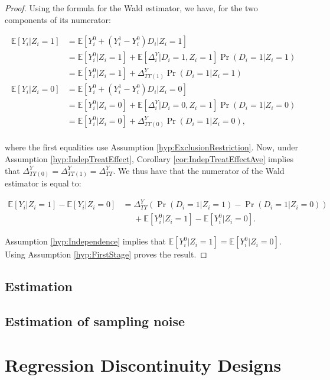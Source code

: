 \documentclass[
]{book}
\newcommand{\esp}[1]{\mathbb{E}[ #1 ]}
\theoremstyle{definition}
\theoremstyle{definition}
\theoremstyle{definition}
\theoremstyle{definition}
\theoremstyle{remark}
\begin{document}
\begin{proof}
\iffalse{} {Proof. } \fi{}Using the formula for the Wald estimator, we have, for the two components of its numerator:

\begin{align*}
\esp{Y_i|Z_i=1} & = \esp{Y_i^0+(Y_i^1-Y_i^0)D_i|Z_i=1} \\
                & = \esp{Y_i^0|Z_i=1}+\esp{\Delta^Y_i|D_i=1,Z_i=1}\Pr(D_i=1|Z_i=1)\\
                & = \esp{Y_i^0|Z_i=1}+\Delta^Y_{TT(1)}\Pr(D_i=1|Z_i=1)\\
\esp{Y_i|Z_i=0} & = \esp{Y_i^0+(Y_i^1-Y_i^0)D_i|Z_i=0} \\
                & = \esp{Y_i^0|Z_i=0}+\esp{\Delta^Y_i|D_i=0,Z_i=1}\Pr(D_i=1|Z_i=0)\\
                & = \esp{Y_i^0|Z_i=0}+\Delta^Y_{TT(0)}\Pr(D_i=1|Z_i=0),\\
\end{align*}

where the first equalities use Assumption \ref{hyp:ExclusionRestriction}.
Now, under Assumption \ref{hyp:IndepTreatEffect}, Corollary \ref{cor:IndepTreatEffectAve} implies that \(\Delta^Y_{TT(0)}=\Delta^Y_{TT(1)}=\Delta^Y_{TT}\).
We thus have that the numerator of the Wald estimator is equal to:

\begin{align*}
\esp{Y_i|Z_i=1}-\esp{Y_i|Z_i=0} & = \Delta^Y_{TT}(\Pr(D_i=1|Z_i=1)-\Pr(D_i=1|Z_i=0))\\
                                & \phantom{=}+\esp{Y_i^0|Z_i=1}-\esp{Y_i^0|Z_i=0}.
\end{align*}

Assumption \ref{hyp:Independence} implies that \(\esp{Y_i^0|Z_i=1}=\esp{Y_i^0|Z_i=0}\).
Using Assumption \ref{hyp:FirstStage} proves the result.
\end{proof}

\hypertarget{estimation}{%
\subsection{Estimation}\label{estimation}}

\hypertarget{estimation-of-sampling-noise}{%
\subsection{Estimation of sampling noise}\label{estimation-of-sampling-noise}}

\hypertarget{regression-discontinuity-designs}{%
\section{Regression Discontinuity Designs}\label{regression-discontinuity-designs}}
\end{document}
